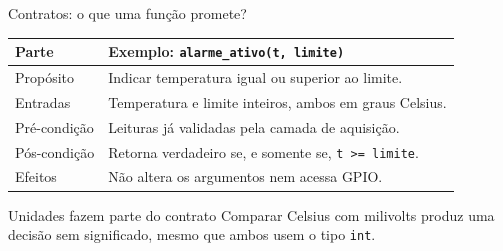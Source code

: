 \begin{frame}{Contratos: o que uma função promete?}
\small
\begin{tabularx}{\textwidth}{lX}
\toprule
Parte & Exemplo: \texttt{alarme\_ativo(t, limite)} \\
\midrule
Propósito & Indicar temperatura igual ou superior ao limite. \\
Entradas & Temperatura e limite inteiros, ambos em graus Celsius. \\
Pré-condição & Leituras já validadas pela camada de aquisição. \\
Pós-condição & Retorna verdadeiro se, e somente se, \texttt{t >= limite}. \\
Efeitos & Não altera os argumentos nem acessa GPIO. \\
\bottomrule
\end{tabularx}
\begin{block}{Unidades fazem parte do contrato}
Comparar Celsius com milivolts produz uma decisão sem significado, mesmo que ambos usem o tipo \texttt{int}.
\end{block}
\end{frame}
